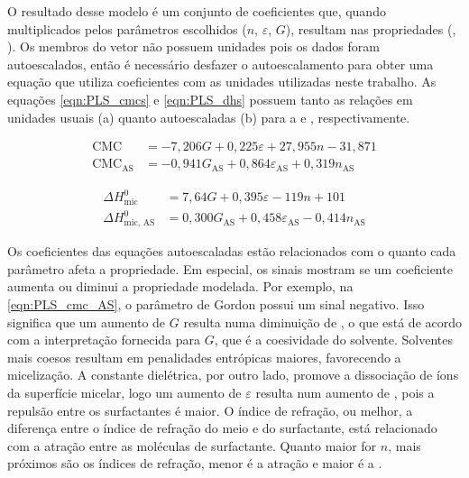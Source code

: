 		O resultado desse modelo é um conjunto de coeficientes que, quando multiplicados pelos parâmetros escolhidos (\(n\), \(\varepsilon\), \(G\)), resultam nas propriedades (\cmc, \DHmic). Os membros do vetor não possuem unidades pois os dados foram autoescalados, então é necessário desfazer o autoescalamento para obter uma equação que utiliza coeficientes com as unidades utilizadas neste trabalho. As equações \ref{eqn:PLS_cmcs} e \ref{eqn:PLS_dhs} possuem tanto as relações em unidades usuais (a) quanto autoescaladas (b) para a \cmc{} e \DHmic, respectivamente. %
				
		\begin{subequations}
			\begin{align}
				\textrm{CMC}               & = -7,206G              + 0,225\varepsilon             + 27,955n            - 31,871  \label{eqn:PLS_cmc}     \\
				\textrm{CMC}_{\textrm{AS}} & = -0,941G_\textrm{AS}  + 0,864\varepsilon_\textrm{AS} + 0,319n_\textrm{AS}           \label{eqn:PLS_cmc_AS}
			\end{align}
			\label{eqn:PLS_cmcs}
		\end{subequations}
		
		\begin{subequations}
			\begin{align}
				\Delta H_\textrm{mic}^0     &= 7,64G              + 0,395\varepsilon             - 119n                + 101  \label{eqn:PLS_dh} \\
				\Delta H_\textrm{mic, AS}^0 &= 0,300G_\textrm{AS} + 0,458\varepsilon_\textrm{AS} - 0,414n_\textrm{AS}         \label{eqn:PLS_dh_AS}
			\end{align}
			\label{eqn:PLS_dhs}
		\end{subequations}
		
		Os coeficientes das equações autoescaladas estão relacionados com o quanto cada parâmetro afeta a propriedade. Em especial, os sinais mostram se um coeficiente aumenta ou diminui a propriedade modelada. Por exemplo, na \autoref{eqn:PLS_cmc_AS}, o parâmetro de Gordon possui um sinal negativo. Isso significa que um aumento de \(G\) resulta numa diminuição de \cmc, o que está de acordo com a interpretação fornecida para \(G\), que é a coesividade do solvente. Solventes mais coesos resultam em penalidades entrópicas maiores, favorecendo a micelização. A constante dielétrica, por outro lado, promove a dissociação de íons da superfície micelar, logo um aumento de \(\varepsilon\) resulta num aumento de \cmc, pois a repulsão entre os surfactantes é maior. O índice de refração, ou melhor, a diferença entre o índice de refração do meio e do surfactante, está relacionado com a atração entre as moléculas de surfactante. Quanto maior for \(n\), mais próximos são os índices de refração, menor é a atração e maior é a \cmc.
		
